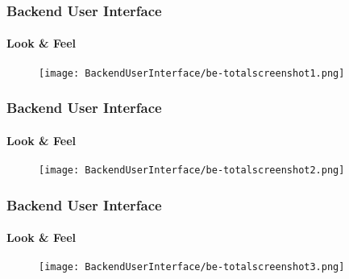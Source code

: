 \begin{frame}[fragile]
	\frametitle{Backend User Interface}
	\framesubtitle{Look \& Feel}

	\begin{figure}
		\texttt{[image: BackendUserInterface/be-totalscreenshot1.png]}
	\end{figure}

\end{frame}


\begin{frame}[fragile]
	\frametitle{Backend User Interface}
	\framesubtitle{Look \& Feel}

	\begin{figure}
		\texttt{[image: BackendUserInterface/be-totalscreenshot2.png]}
	\end{figure}

\end{frame}


\begin{frame}[fragile]
	\frametitle{Backend User Interface}
	\framesubtitle{Look \& Feel}

	\begin{figure}
		\texttt{[image: BackendUserInterface/be-totalscreenshot3.png]}
	\end{figure}

\end{frame}


